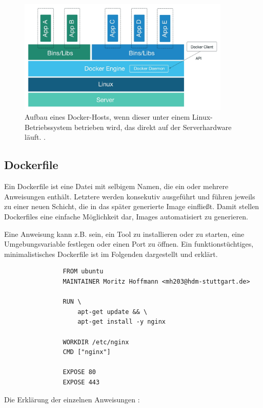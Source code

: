\documentclass[../main.tex]{subfiles}
\begin{document}
      \begin{figure}[h]
          \centering
          \includegraphics[width=0.9\textwidth]{./images/intro_dockerHost.jpg}
          \caption{Aufbau eines Docker-Hosts, wenn dieser unter einem Linux-Betriebssystem betrieben wird, das direkt auf der Serverhardware läuft. \cite[S.3]{dockerSecIntro}.}
          \label{fig:intro_dockerHost}
      \end{figure}

		\subsection{Dockerfile}
		\label{dockerDockerfile}
      Ein Dockerfile ist eine Datei mit selbigem Namen, die ein oder mehrere Anweisungen enthält. Letztere werden konsekutiv ausgeführt und führen jeweils zu einer neuen Schicht, die in das später generierte Image einfließt. Damit stellen Dockerfiles eine einfache Möglichkeit dar, Images automatisiert zu generieren.

      Eine Anweisung kann z.B. sein, ein Tool zu installieren oder zu starten, eine Umgebungsvariable festlegen oder einen Port zu öffnen. Ein funktionstüchtiges, minimalistisches Dockerfile ist im Folgenden dargestellt und erklärt.

			\begin{lstlisting}
				FROM ubuntu
				MAINTAINER Moritz Hoffmann <mh203@hdm-stuttgart.de>

				RUN \
					apt-get update && \
					apt-get install -y nginx

				WORKDIR /etc/nginx
				CMD ["nginx"]

				EXPOSE 80
				EXPOSE 443
			\end{lstlisting}

			Die Erklärung der einzelnen Anweisungen \cite{dockerDockerfileDocs}:
\end{document}

